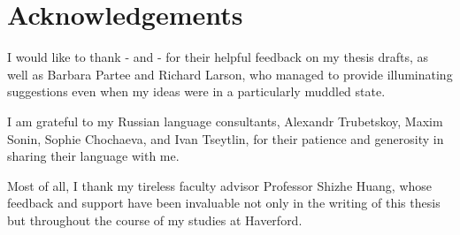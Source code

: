 \section*{Acknowledgements}
I would like to thank - and - for their helpful feedback on my thesis drafts, as well as Barbara Partee and Richard Larson, who managed to provide illuminating suggestions even when my ideas were in a particularly muddled state.

I am grateful to my Russian language consultants, Alexandr Trubetskoy, Maxim Sonin, Sophie Chochaeva, and Ivan Tseytlin, for their patience and generosity in sharing their language with me.

Most of all, I thank my tireless faculty advisor Professor Shizhe Huang, whose feedback and support have been invaluable not only in the writing of this thesis but throughout the course of my studies at Haverford.